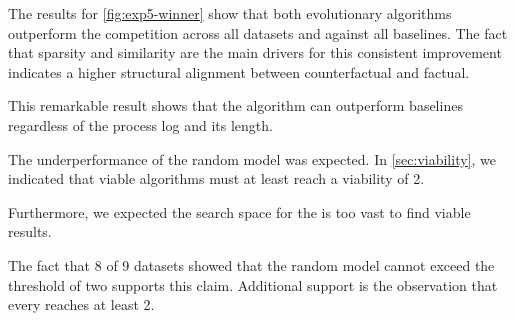 \documentclass[./../../paper.tex]{subfiles}
\begin{document}
The results for \autoref{fig:exp5-winner} show that both evolutionary algorithms outperform the competition across all datasets and against all baselines. The fact that sparsity and similarity are the main drivers for this consistent improvement indicates a higher structural alignment between counterfactual and factual. 



This remarkable result shows that the algorithm can outperform baselines regardless of the process log and its length.



The underperformance of the random model was expected. In \autoref{sec:viability}, we indicated that viable algorithms must at least reach a viability of 2. 

Furthermore, we expected the search space for the \ModelRNG is too vast to find viable results. 

The fact that 8 of 9 datasets showed that the random model cannot exceed the threshold of two supports this claim. Additional support is the observation that every \ModelCBG reaches at least 2.



\end{document}
